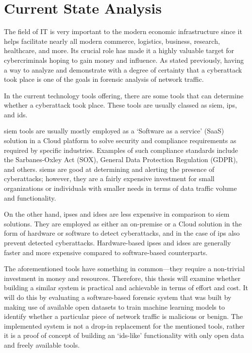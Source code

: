 \clearpage%

\chapter{Current State Analysis}\label{ch:current-state-analysis}

The field of IT is very important to the modern economic infrastructure since it helps facilitate nearly all modern
commerce, logistics, business, research, healthcare, and more.
Its crucial role has made it a highly valuable target for cybercriminals hoping to gain money and influence.
As stated previously, having a way to analyze and demonstrate with a degree of certainty that a cyberattack took place is one of the goals in forensic analysis of network traffic.

In the current technology tools offering, there are some tools that can determine whether a cyberattack took place.
These tools are usually classed as \gls{siem}, \gls{ips}, and \gls{ids}.

\gls{siem} tools are usually mostly employed as a `Software as a service' (SaaS) solution in a Cloud platform to
solve security and compliance requirements as required by specific industries.
Examples of such compliance standards include the Sarbanes-Oxley Act (SOX), General Data Protection Regulation (GDPR), and others.
\gls{siem}s are good at determining and alerting the presence of cyberattacks;
however, they are a fairly expensive investment for small organizations or individuals with smaller needs in terms of data traffic volume and functionality.

On the other hand, \gls{ips}es and \gls{ids}es are less expensive in comparison to \gls{siem} solutions.
They are employed as either an on-premise or a Cloud solution in the form of hardware or software to detect cyberattacks,
and in the case of \gls{ips} also prevent detected cyberattacks.
Hardware-based \gls{ips}es and \gls{ids}es are generally faster and more expensive compared to software-based counterparts.

The aforementioned tools have something in common—they require a non-trivial investment in money and resources.
Therefore, this thesis will examine whether building a similar system is practical and achievable in terms of effort and cost.
It will do this by evaluating a software-based forensic system that was built by making use of available open datasets to train machine learning models to identify whether a particular piece of network traffic is malicious or benign.
The implemented system is not a drop-in replacement for the mentioned tools, rather it is a proof of concept of building an `\gls{ids}-like' functionality with only open data and freely available tools.
